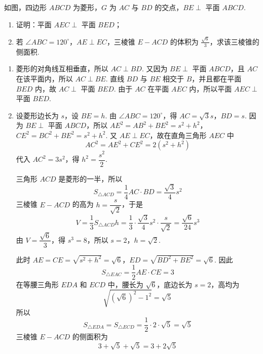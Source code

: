 \begin{problem}
如图，四边形 \(ABCD\) 为菱形，\(G\) 为 \(AC\) 与 \(BD\) 的交点，\(BE \perp\) 平面 \(ABCD\).

\begin{enumerate}
\item 证明：平面 \(AEC \perp\) 平面 \(BED\)；
\item 若 \(\angle ABC = 120^{\circ}\)，\(AE \perp EC\)，三棱锥 \(E - ACD\) 的体积为 \(\frac{\sqrt{6}}{3}\)，求该三棱锥的侧面积.
\end{enumerate}

\end{problem}

\begin{solution}
\begin{enumerate}
\item 菱形的对角线互相垂直，所以 \(AC\perp BD\). 又因为 \(BE\perp\) 平面 \(ABCD\)，且 \(AC\) 在该平面内，所以 \(AC\perp BE\). 直线 \(BD\) 与 \(BE\) 相交于 \(B\)，并且都在平面 \(BED\) 内，故 \(AC\perp\) 平面 \(BED\). 由于 \(AC\) 在平面 \(AEC\) 内，所以平面 \(AEC\perp\) 平面 \(BED\).

\item 设菱形边长为 \(s\)，设 \(BE=h\). 由 \(\angle ABC=120^\circ\)，得
\(AC=\sqrt3s\)，\(BD=s\).
因为 \(BE\perp\) 平面 \(ABCD\)，所以
\(AE^2=AB^2+BE^2=s^2+h^2\)，\(CE^2=BC^2+BE^2=s^2+h^2\).
又 \(AE\perp EC\)，故在直角三角形 \(AEC\) 中
\[
AC^2=AE^2+CE^2=2(s^2+h^2)
\]
代入 \(AC^2=3s^2\)，得 \(h^2=\dfrac{s^2}{2}\).

三角形 \(ACD\) 是菱形的一半，所以
\[
S_{\triangle ACD}=\frac14AC\cdot BD=\frac{\sqrt3}{4}s^2
\]
三棱锥 \(E-ACD\) 的高为 \(h=\dfrac{s}{\sqrt2}\)，于是
\[
V=\frac13S_{\triangle ACD}h
=\frac13\cdot\frac{\sqrt3}{4}s^2\cdot\frac{s}{\sqrt2}
=\frac{\sqrt6}{24}s^3
\]
由 \(V=\dfrac{\sqrt6}{3}\)，得 \(s^3=8\)，所以 \(s=2\)，\(h=\sqrt2\).

此时
\(AE=CE=\sqrt{s^2+h^2}=\sqrt6\)，\(ED=\sqrt{BD^2+BE^2}=\sqrt6\).
因此
\[
S_{\triangle EAC}=\frac12AE\cdot CE=3
\]
在等腰三角形 \(EDA\) 和 \(ECD\) 中，腰长为 \(\sqrt6\)，底边长为 \(s=2\)，高均为
\[
\sqrt{(\sqrt6)^2-1^2}=\sqrt5
\]
所以
\[
S_{\triangle EDA}=S_{\triangle ECD}=\frac12\cdot2\cdot\sqrt5=\sqrt5
\]
三棱锥 \(E-ACD\) 的侧面积为
\[
3+\sqrt5+\sqrt5=3+2\sqrt5
\]
\end{enumerate}
\end{solution}

